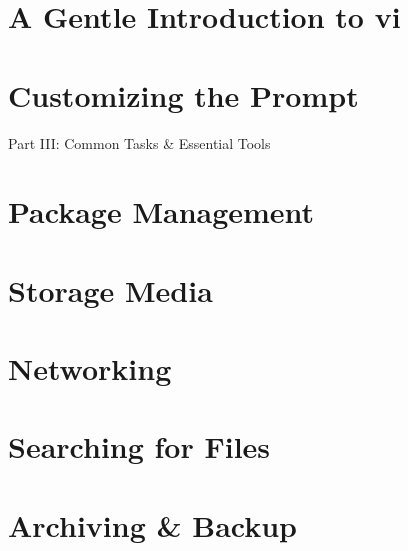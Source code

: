 \documentclass[oneside]{book}
\numberwithin{equation}{section}
\begin{document}

\section{A Gentle Introduction to vi}


\section{Customizing the Prompt}


\begin{center}
	\huge Part III: Common Tasks \& Essential Tools
\end{center}


\section{Package Management}


\section{Storage Media}


\section{Networking}


\section{Searching for Files}


\section{Archiving \& Backup}
\end{document}

